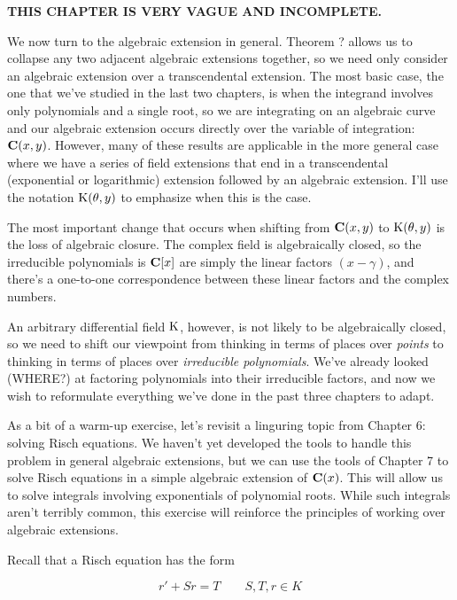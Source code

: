 

{\bf THIS CHAPTER IS VERY VAGUE AND INCOMPLETE.}

We now turn to the algebraic extension in general.  Theorem ? allows
us to collapse any two adjacent algebraic extensions together, so we
need only consider an algebraic extension over a transcendental
extension.  The most basic case, the one that we've studied in the
last two chapters, is when the integrand involves only polynomials and
a single root, so we are integrating on an algebraic curve and our
algebraic extension occurs directly over the variable of integration:
${\bf C}(x,y)$.  However, many of these results are applicable in the
more general case where we have a series of field extensions that end
in a transcendental (exponential or logarithmic) extension followed by
an algebraic extension.  I'll use the notation ${\rm K}(\theta, y)$ to
emphasize when this is the case.

The most important change that occurs when shifting from $\mathbf{C}(x,y)$ to
${\rm K}(\theta,y)$ is the loss of algebraic closure.  The complex
field is algebraically closed, so the irreducible polynomials is
$\mathbf{C}[x]$ are simply the linear factors $(x-\gamma)$, and there's a
one-to-one correspondence between these linear factors and the complex
numbers.

An arbitrary differential field ${\rm K}$, however, is not likely to
be algebraically closed, so we need to shift our viewpoint from
thinking in terms of places over {\it points} to thinking in terms of
places over {\it irreducible polynomials}.  We've already looked
(WHERE?) at factoring polynomials into their irreducible factors, and
now we wish to reformulate everything we've done in the past three
chapters to adapt.


As a bit of a warm-up exercise, let's revisit a linguring topic from
Chapter 6: solving Risch equations.  We haven't yet developed the
tools to handle this problem in general algebraic extensions, but we
can use the tools of Chapter 7 to solve Risch equations in a simple
algebraic extension of $\mathbf{C}(x)$.  This will allow us to solve integrals
involving exponentials of polynomial roots.  While such integrals
aren't terribly common, this exercise will reinforce the principles
of working over algebraic extensions.

Recall that a Risch equation has the form

\begin{equation}
r' + S r = T \qquad S,T,r \in K
\end{equation}

